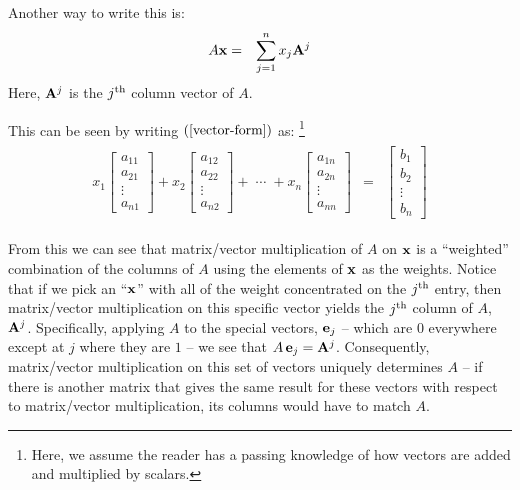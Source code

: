 \documentclass{article}
\begin{document}
Another way to write this is:
\begin{eqnarray}
	A {\bf x} & = & \sum_{j=1}^n x_j {\bf A}^j \label{mult-as-vec-combo}
\end{eqnarray}
Here, ${\bf A}^j$ is the $j^{\rm th}$ column vector of $A$. 

This can be seen by writing $(\ref{vector-form})$ as:%
\footnote{Here, we assume the reader has a passing knowledge of how vectors 
are added and multiplied by scalars.}
\begin{eqnarray}
  \begin{array}{ccc}
	  x_1 \left[ \begin{array}{c}
			  a_{11} \\
			  a_{21} \\
		  	  \vdots \\
			  a_{n1}
		     \end{array}
	      \right]
		  +  
	  x_2 \left[ \begin{array}{c}
			  a_{12} \\
			  a_{22} \\
		  	  \vdots \\
			  a_{n2}
		     \end{array}
	      \right]
		  + \; \cdots \;
		  + 
	  x_n \left[ \begin{array}{c}
			  a_{1n} \\
			  a_{2n} \\
		  	  \vdots \\
			  a_{nn}
		     \end{array}
	      \right]
	  & = &
                \left[
                \begin{array}{c}
                  b_1    \\
                  b_2    \\
                  \vdots \\
                  b_n
                \end{array}
  \right] 
  \end{array} \label{matrix-form3}
\end{eqnarray}

From this we can see that matrix/vector multiplication of $A$ on ${\bf x}$ is
a ``weighted'' combination of the columns of $A$ using the elements of ${\bf x}$
as the weights. Notice that if we pick an ``${\bf x}$'' with all of the weight 
concentrated on the $j^{\rm th}$ entry, then matrix/vector multiplication on this 
specific vector yields the $j^{\rm th}$ 
column of $A$, ${\bf A}^j$. Specifically, applying $A$ to the special
vectors, ${\bf e}_j$
-- which are $0$ everywhere except at $j$ where they are $1$ --
we see that $A \, {\bf e}_j = {\bf A}^j$. 
Consequently, matrix/vector multiplication on this set of vectors
uniquely determines $A$
-- if there is another matrix that gives the same result for these vectors with
respect to matrix/vector multiplication, 
its columns would have to match $A$.
\end{document}
